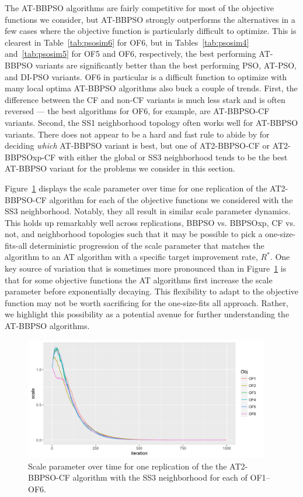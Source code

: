 \documentclass[cmbright]{staauth}
\begin{document}
The AT-BBPSO algorithms are fairly competitive for most of the objective functions we consider, but AT-BBPSO strongly outperforms the alternatives in a few cases where the objective function is particularly difficult to optimize. This is clearest in Table~\ref{tab:psosim6} for OF6, but in Tables~\ref{tab:psosim4} and~\ref{tab:psosim5} for OF5 and OF6, respectively, the best performing AT-BBPSO variants are significantly better than the best performing PSO, AT-PSO, and DI-PSO variants. OF6 in particular is a difficult function to optimize with many local optima AT-BBPSO algorithms also buck a couple of trends. First, the difference between the CF and non-CF variants is much less stark and is often reversed --- the best algorithms for OF6, for example, are AT-BBPSO-CF variants. Second, the SS1 neighborhood topology often works well for AT-BBPSO variants. There does not appear to be a hard and fast rule to abide by for deciding \emph{which} AT-BBPSO variant is best, but one of AT2-BBPSO-CF or AT2-BBPSOxp-CF with either the global or SS3 neighborhood tends to be the best AT-BBPSO variant for the problems we consider in this section.

Figure~\ref{fig:scale} displays the scale parameter over time for one replication of the AT2-BBPSO-CF algorithm for each of the objective functions we considered with the SS3 neighborhood. Notably, they all result in similar scale parameter dynamics. This holds up remarkably well across replications, BBPSO vs. BBPSOxp, CF vs. not, and neighborhood topologies such that it may be possible to pick a one-size-fits-all deterministic progression of the scale parameter that matches the algorithm to an AT algorithm with a specific target improvement rate, $R^*$. One key source of variation that is sometimes more pronounced than in Figure~\ref{fig:scale} is that for some objective functions the AT algorithms first increase the scale parameter before exponentially decaying. This flexibility to adapt to the objective function may not be worth sacrificing for the one-size-fits all approach. Rather, we highlight this possibility as a potential avenue for further understanding the AT-BBPSO algorithms.

\begin{figure}[p]
\centering
\includegraphics[width=0.95\textwidth]{../code/psosims/scaleplot.png}
\caption{Scale parameter over time for one replication of the the AT2-BBPSO-CF algorithm with the SS3 neighborhood for each of OF1--OF6.}
\label{fig:scale}
\end{figure}
\end{document}
